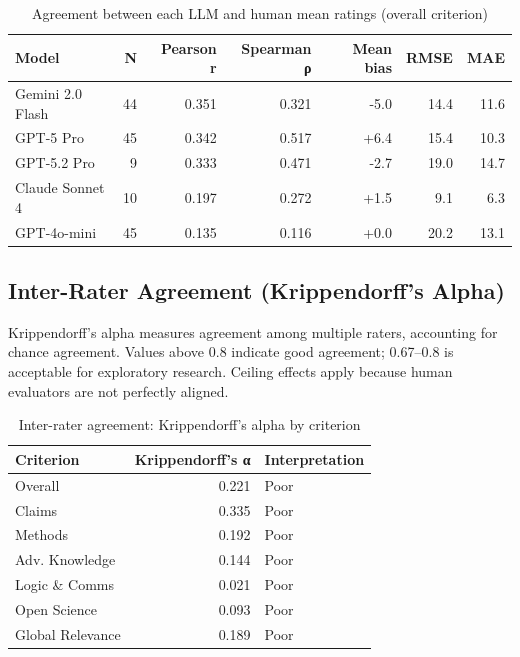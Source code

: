 \documentclass[
  11pt,
  letterpaper,
  DIV=11,
  numbers=noendperiod]{scrreprt}
\begin{document}
\begin{longtable}[]{@{}lrrrrrr@{}}

\caption{\label{tbl-agreement}Agreement between each LLM and human mean
ratings (overall criterion)}

\tabularnewline

\toprule\noalign{}
Model & N & Pearson r & Spearman ρ & Mean bias & RMSE & MAE \\
\midrule\noalign{}
\endhead
\bottomrule\noalign{}
\endlastfoot
Gemini 2.0 Flash & 44 & 0.351 & 0.321 & -5.0 & 14.4 & 11.6 \\
GPT-5 Pro & 45 & 0.342 & 0.517 & +6.4 & 15.4 & 10.3 \\
GPT-5.2 Pro & 9 & 0.333 & 0.471 & -2.7 & 19.0 & 14.7 \\
Claude Sonnet 4 & 10 & 0.197 & 0.272 & +1.5 & 9.1 & 6.3 \\
GPT-4o-mini & 45 & 0.135 & 0.116 & +0.0 & 20.2 & 13.1 \\

\end{longtable}

\subsection{Inter-Rater Agreement (Krippendorff's
Alpha)}\label{inter-rater-agreement-krippendorffs-alpha}

Krippendorff's alpha measures agreement among multiple raters,
accounting for chance agreement. Values above 0.8 indicate good
agreement; 0.67--0.8 is acceptable for exploratory research. Ceiling
effects apply because human evaluators are not perfectly aligned.

\begin{longtable}[]{@{}lrl@{}}

\caption{\label{tbl-krippendorff}Inter-rater agreement: Krippendorff's
alpha by criterion}

\tabularnewline

\toprule\noalign{}
Criterion & Krippendorff's α & Interpretation \\
\midrule\noalign{}
\endhead
\bottomrule\noalign{}
\endlastfoot
Overall & 0.221 & Poor \\
Claims & 0.335 & Poor \\
Methods & 0.192 & Poor \\
Adv. Knowledge & 0.144 & Poor \\
Logic \& Comms & 0.021 & Poor \\
Open Science & 0.093 & Poor \\
Global Relevance & 0.189 & Poor \\

\end{longtable}
\end{document}
